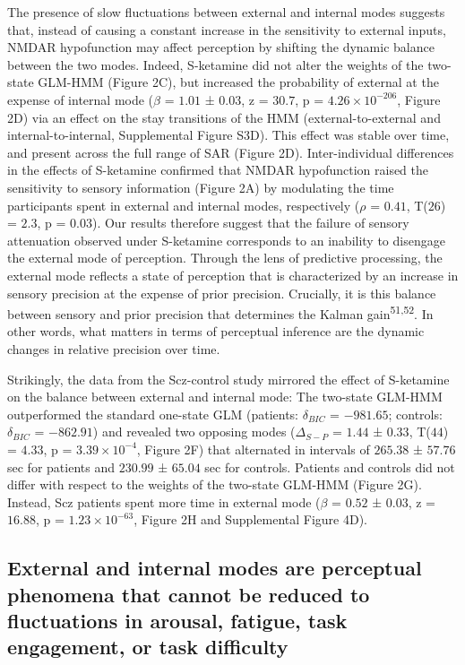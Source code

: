 \documentclass[
]{article}
\begin{document}
The presence of slow fluctuations between external and internal modes
suggests that, instead of causing a constant increase in the sensitivity
to external inputs, NMDAR hypofunction may affect perception by shifting
the dynamic balance between the two modes. Indeed, S-ketamine did not
alter the weights of the two-state GLM-HMM (Figure 2C), but increased
the probability of external at the expense of internal mode (\(\beta\) =
\(1.01\) ± \(0.03\), z = \(30.7\), p =
\(\ensuremath{4.26\times 10^{-206}}\), Figure 2D) via an effect on the
stay transitions of the HMM (external-to-external and
internal-to-internal, Supplemental Figure S3D). This effect was stable
over time, and present across the full range of SAR (Figure 2D).
Inter-individual differences in the effects of S-ketamine confirmed that
NMDAR hypofunction raised the sensitivity to sensory information (Figure
2A) by modulating the time participants spent in external and internal
modes, respectively (\(\rho\) = \(0.41\), T(\(26\)) = \(2.3\), p =
\(0.03\)). Our results therefore suggest that the failure of sensory
attenuation observed under S-ketamine corresponds to an inability to
disengage the external mode of perception. Through the lens of
predictive processing, the external mode reflects a state of perception
that is characterized by an increase in sensory precision at the expense
of prior precision. Crucially, it is this balance between sensory and
prior precision that determines the Kalman gain\textsuperscript{51,52}.
In other words, what matters in terms of perceptual inference are the
dynamic changes in relative precision over time.

Strikingly, the data from the Scz-control study mirrored the effect of
S-ketamine on the balance between external and internal mode: The
two-state GLM-HMM outperformed the standard one-state GLM (patients:
\(\delta_{BIC}\) = \(-981.65\); controls: \(\delta_{BIC}\) =
\(-862.91\)) and revealed two opposing modes (\(\Delta_{S-P}\) =
\(1.44\) ± \(0.33\), T(\(44\)) = \(4.33\), p =
\(\ensuremath{3.39\times 10^{-4}}\), Figure 2F) that alternated in
intervals of \(265.38\) ± \(57.76\) sec for patients and \(230.99\) ±
\(65.04\) sec for controls. Patients and controls did not differ with
respect to the weights of the two-state GLM-HMM (Figure 2G). Instead,
Scz patients spent more time in external mode (\(\beta\) = \(0.52\) ±
\(0.03\), z = \(16.88\), p = \(\ensuremath{1.23\times 10^{-63}}\),
Figure 2H and Supplemental Figure 4D).

\subsection{External and internal modes are perceptual phenomena that
cannot be reduced to fluctuations in arousal, fatigue, task engagement,
or task
difficulty}\label{external-and-internal-modes-are-perceptual-phenomena-that-cannot-be-reduced-to-fluctuations-in-arousal-fatigue-task-engagement-or-task-difficulty}
\end{document}
